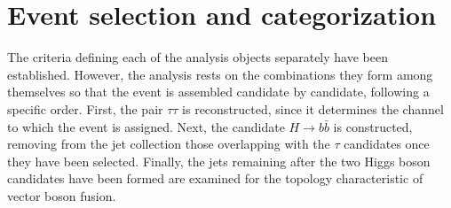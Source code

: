 \section{Event selection and categorization}
\label{sec:bbtt_flow}
%
The criteria defining each of the analysis objects separately have been established. However, the analysis rests on the combinations they form among themselves so that the event is assembled candidate by candidate, following a specific order. First, the pair $\tau\tau$ is reconstructed, since it determines the channel to which the event is assigned. Next, the candidate $H\to b\bar{b}$ is constructed, removing from the jet collection those overlapping with the $\tau$ candidates once they have been selected. Finally, the jets remaining after the two Higgs boson candidates have been formed are examined for the topology characteristic of vector boson fusion.

